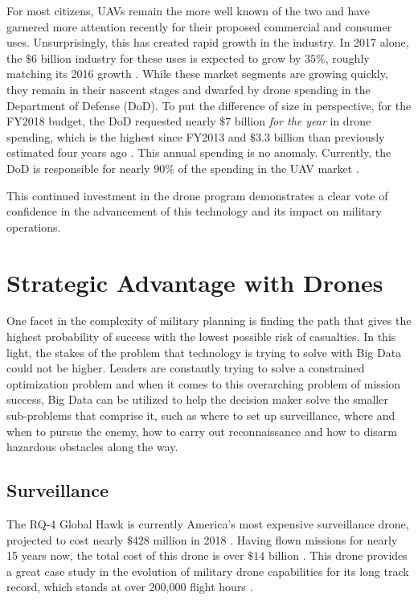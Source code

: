 \documentclass[sigconf]{acmart}
\begin{document}
For most citizens, UAVs remain the more well known of the two and have garnered more attention recently for their proposed commercial and consumer uses. Unsurprisingly, this has created rapid growth in the industry. In 2017 alone, the $\$6$ billion industry for these uses is expected to grow by $35\%$, roughly matching its 2016 growth \cite{gartner}. While these market segments are growing quickly, they remain in their nascent stages and dwarfed by drone spending in the Department of Defense (DoD). To put the difference of size in perspective, for the FY2018 budget, the DoD requested nearly $\$7$ billion \emph{for the year} in drone spending, which is the highest since FY2013 and $\$3.3$ billion than previously estimated four years ago \cite{dronebudget}. This annual spending is no anomaly. Currently, the DoD is responsible for nearly $90\%$ of the spending in the UAV market \cite{economist}. 

This continued investment in the drone program demonstrates a clear vote of confidence in the advancement of this technology and its impact on military operations. 



\section{Strategic Advantage with Drones}
One facet in the complexity of military planning is finding the path that gives the highest probability of success with the lowest possible risk of casualties. In this light, the stakes of the problem that technology is trying to solve with Big Data could not be higher. Leaders are constantly trying to solve a constrained optimization problem and when it comes to this overarching problem of mission success, Big Data can be utilized to help the decision maker solve the smaller sub-problems that comprise it, such as where to set up surveillance, where and when to pursue the enemy, how to carry out reconnaissance and how to disarm hazardous obstacles along the way.

\subsection{Surveillance}
The RQ-4 Global Hawk is currently America's most expensive surveillance drone, projected to cost nearly $\$428$ million in 2018 \cite{dronebudget}. Having flown missions for nearly 15 years now, the total cost of this drone is over $\$14$ billion \cite{rq4}. This drone provides a great case study in the evolution of military drone capabilities for its long track record, which stands at over 200,000 flight hours \cite{northrq4}. 
\end{document}

